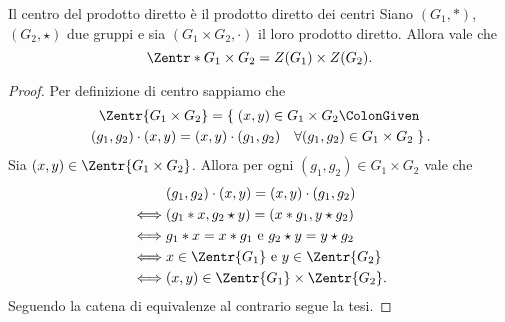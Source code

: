 \begin{proposition}
    {Il centro del prodotto diretto è il prodotto diretto dei centri}{}
    Siano $(G_1, \ast)$, $(G_2, \star)$ due gruppi e sia $(G_1 \times G_2, \cdot)$ il loro prodotto diretto.
    Allora vale che \[
        \Zentr*{G_1 \times G_2} = Z(G_1) \times Z(G_2).
    \]
\end{proposition}
\begin{proof}
    Per definizione di centro sappiamo che \begin{multline*}
        \Zentr{G_1 \times G_2} = \left\{\;(x, y) \in G_1 \times G_2 \ColonGiven \right. \\
        \left. (g_1, g_2) \cdot (x, y) = (x, y) \cdot (g_1, g_2) \quad \forall(g_1,g_2) \in G_1 \times G_2\;\right\}.  
    \end{multline*}
    Sia $(x, y) \in \Zentr{G_1 \times G_2}$. Allora per ogni $ (g_1,g_2) \in G_1 \times G_2$ vale che \begin{align*}
        &(g_1, g_2) \cdot (x, y) = (x, y) \cdot (g_1, g_2) \\
        \iff &(g_1 \ast x, g_2 \star y) = (x * g_1, y \star g_2)\\
        \iff &g_1 \ast x = x*g_1 \text{ e } g_2 \star y = y \star g_2\\
        \iff &x \in \Zentr{G_1} \text{ e } y \in \Zentr{G_2}\\
        \iff &(x, y) \in \Zentr{G_1} \times \Zentr{G_2}.
    \end{align*}
    Seguendo la catena di equivalenze al contrario segue la tesi.
\end{proof}

